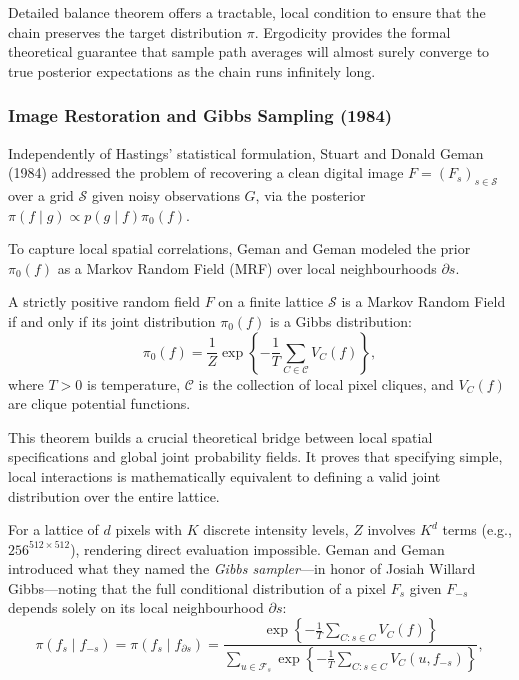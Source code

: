 \noindent Detailed balance theorem offers a tractable, local condition to ensure that the chain preserves the target distribution $\pi$. Ergodicity provides the formal theoretical guarantee that sample path averages will almost surely converge to true posterior expectations as the chain runs infinitely long.

\subsubsection{Image Restoration and Gibbs Sampling (1984)}
\label{subsec:gibbs-sampling}

Independently of Hastings' statistical formulation, Stuart and Donald Geman (1984) \cite{geman1984} addressed the problem of recovering a clean digital image $F = (F_s)_{s \in \mathcal{S}}$ over a grid $\mathcal{S}$ given noisy observations $G$, via the posterior $\pi(f \mid g) \propto p(g \mid f) \pi_0(f)$.

To capture local spatial correlations, Geman and Geman modeled the prior $\pi_0(f)$ as a Markov Random Field (MRF) over local neighbourhoods $\partial s$.

\begin{theorem}
\label{thm:hammersley-clifford}
A strictly positive random field $F$ on a finite lattice $\mathcal{S}$ is a Markov Random Field if and only if its joint distribution $\pi_0(f)$ is a Gibbs distribution:
\begin{equation}
    \pi_0(f) = \frac{1}{Z} \exp\left\{ -\frac{1}{T} \sum_{C \in \mathcal{C}} V_C(f) \right\},
\end{equation}
where $T > 0$ is temperature, $\mathcal{C}$ is the collection of local pixel cliques, and $V_C(f)$ are clique potential functions.
\end{theorem}

\noindent This theorem builds a crucial theoretical bridge between local spatial specifications and global joint probability fields. It proves that specifying simple, local interactions is mathematically equivalent to defining a valid joint distribution over the entire lattice.

For a lattice of $d$ pixels with $K$ discrete intensity levels, $Z$ involves $K^d$ terms (e.g., $256^{512 \times 512}$), rendering direct evaluation impossible. Geman and Geman introduced what they named the \emph{Gibbs sampler}—in honor of Josiah Willard Gibbs—noting that the full conditional distribution of a pixel $F_s$ given $F_{-s}$ depends solely on its local neighbourhood $\partial s$:
\begin{equation}
    \pi(f_s \mid f_{-s}) = \pi(f_s \mid f_{\partial s}) = \frac{\exp\left\{ -\frac{1}{T} \sum_{C : s \in C} V_C(f) \right\}}{\sum_{u \in \mathcal{F}_s} \exp\left\{ -\frac{1}{T} \sum_{C : s \in C} V_C(u, f_{-s}) \right\}},
\end{equation}


